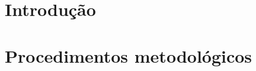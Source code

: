 \documentclass[
	11pt,				%
	openright,			%
	oneside,			%
	a4paper,			%
	english,			%
	french,				%
	spanish,			%
	brazil,				%
	]{abntex2}
\begin{document}
%
%
%
%

\tableofcontents*
\cleardoublepage



\textual

\chapter[Introdução]{Introdução}
\label{Introducao}


\chapter{Procedimentos metodológicos}

\end{document}
